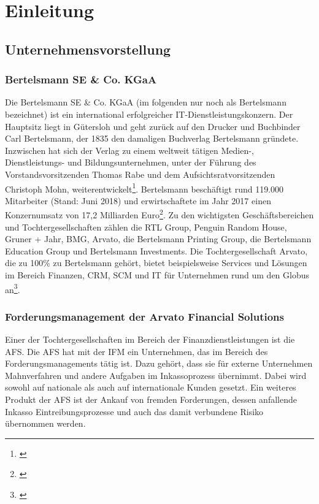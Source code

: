 \section{Einleitung}


\subsection{Unternehmensvorstellung}
\subsubsection{Bertelsmann SE \& Co. KGaA} Die Bertelsmann SE \& Co. KGaA (im folgenden nur noch als Bertelsmann bezeichnet) ist ein international erfolgreicher IT-Dienstleistungskonzern. Der Hauptsitz liegt in Gütersloh und geht zurück auf den Drucker und Buchbinder Carl Bertelsmann, der 1835 den damaligen Buchverlag Bertelsmann gründete. Inzwischen hat sich der Verlag zu einem weltweit tätigen Medien-, Dienstleistungs- und Bildungsunternehmen, unter der Führung des Vorstandsvorsitzenden Thomas Rabe und dem Aufsichtsratvorsitzenden Christoph Mohn, weiterentwickelt\footnote{\cite{BertelsmannGeschaeftsbericht2016}}. Bertelsmann beschäftigt rund 119.000 Mitarbeiter (Stand: Juni 2018) und erwirtschaftete im Jahr 2017 einen Konzernumsatz von 17,2 Milliarden Euro\footnote{\cite{BertelsmannAufEinenBlick2018}}. Zu den wichtigsten Geschäftsbereichen und Tochtergesellschaften zählen die RTL Group, Penguin Random House, Gruner + Jahr, BMG, Arvato, die Bertelsmann Printing Group, die Bertelsmann Education Group und Bertelsmann Investments. Die Tochtergesellschaft Arvato, die zu 100\% zu Bertelsmann gehört, bietet beispielsweise Services und Lösungen im Bereich Finanzen, \gls{CRM}, \gls{SCM} und IT für Unternehmen rund um den Globus an\footnote{\cite{BertelsmannGeschaeftsbericht2016}}.


\subsubsection{Forderungsmanagement der Arvato Financial Solutions}
Einer der Tochtergesellschaften im Bereich der Finanzdienstleistungen ist die \gls{AFS}. Die \gls{AFS} hat mit der \gls{IFM} ein Unternehmen, das im Bereich des Forderungsmanagements tätig ist. Dazu gehört, dass sie für externe Unternehmen Mahnverfahren und andere Aufgaben im Inkassoprozess übernimmt. Dabei wird sowohl auf nationale als auch auf internationale Kunden gesetzt. Ein weiteres Produkt der \gls{AFS} ist der Ankauf von fremden Forderungen, dessen anfallende Inkasso Eintreibungsprozesse und auch das damit verbundene Risiko übernommen werden. 

